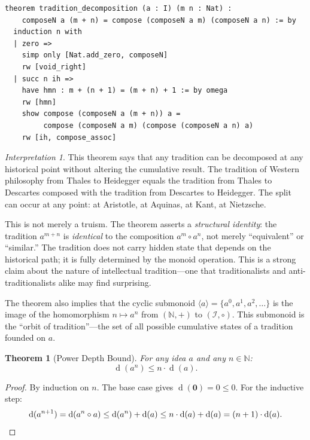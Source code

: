 \documentclass[11pt,openany]{book}
\theoremstyle{definition}
\theoremstyle{plain}
\newtheorem{theorem}[axiom]{Theorem}
\theoremstyle{remark}
\newtheorem{interpretation}[axiom]{Interpretation}
\newcommand{\IS}{\mathcal{I}}               %
\newcommand{\compose}{\circ}                 %
\newcommand{\void}{\mathbf{0}}              %
\newcommand{\depth}{\operatorname{d}}       %
\begin{document}
\begin{lstlisting}[language=Lean4]
theorem tradition_decomposition (a : I) (m n : Nat) :
    composeN a (m + n) = compose (composeN a m) (composeN a n) := by
  induction n with
  | zero =>
    simp only [Nat.add_zero, composeN]
    rw [void_right]
  | succ n ih =>
    have hmn : m + (n + 1) = (m + n) + 1 := by omega
    rw [hmn]
    show compose (composeN a (m + n)) a =
         compose (composeN a m) (compose (composeN a n) a)
    rw [ih, compose_assoc]
\end{lstlisting}

\begin{interpretation}
This theorem says that any tradition can be decomposed at any historical point without altering the cumulative result. The tradition of Western philosophy from Thales to Heidegger equals the tradition from Thales to Descartes composed with the tradition from Descartes to Heidegger. The split can occur at any point: at Aristotle, at Aquinas, at Kant, at Nietzsche.

This is not merely a truism. The theorem asserts a \emph{structural identity}: the tradition $a^{m+n}$ is \emph{identical} to the composition $a^m \compose a^n$, not merely ``equivalent'' or ``similar.'' The tradition does not carry hidden state that depends on the historical path; it is fully determined by the monoid operation. This is a strong claim about the nature of intellectual tradition---one that traditionalists and anti-traditionalists alike may find surprising.

The theorem also implies that the cyclic submonoid $\langle a \rangle = \{a^0, a^1, a^2, \ldots\}$ is the image of the homomorphism $n \mapsto a^n$ from $(\mathbb{N}, +)$ to $(\IS, \compose)$. This submonoid is the ``orbit of tradition''---the set of all possible cumulative states of a tradition founded on $a$.
\end{interpretation}

\begin{theorem}[Power Depth Bound]
\label{thm:power-depth}
For any idea $a$ and any $n \in \mathbb{N}$:
\[
\depth(a^n) \leq n \cdot \depth(a).
\]
\end{theorem}

\begin{proof}
By induction on $n$. The base case gives $\depth(\void) = 0 \leq 0$. For the inductive step:
\[
\depth(a^{n+1}) = \depth(a^n \compose a) \leq \depth(a^n) + \depth(a) \leq n \cdot \depth(a) + \depth(a) = (n+1) \cdot \depth(a). \qedhere
\]
\end{proof}
\end{document}
